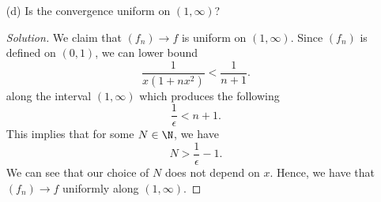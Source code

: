 \begin{enumerate}
\begin{proof}[Solution]
        \end{proof}
    \item[(d)] Is the convergence uniform on \( (1,\infty ) \)?
        \begin{proof}[Solution]
        We claim that \( (f_n) \to f  \) is uniform on \( (1,\infty )  \). Since \( (f_n)  \) is defined on \( (0,1)  \), we can lower bound 
        \[   \frac{ 1 }{ x (1 +nx^2 ) } < \frac{ 1 }{ n+ 1 }.  \]
        along the interval \( (1,\infty )  \) which produces the following 
        \[  \frac{ 1 }{ \epsilon  }  < n + 1.\]
        This implies that for some \( N \in \N  \), we have 
        \[  N > \frac{ 1 }{ \epsilon  }  - 1. \]
        We can see that our choice of \( N  \) does not depend on \( x  \). Hence, we have that \( (f_n) \to f  \) uniformly along \( (1,\infty ) \).
        \end{proof}
\end{enumerate}


